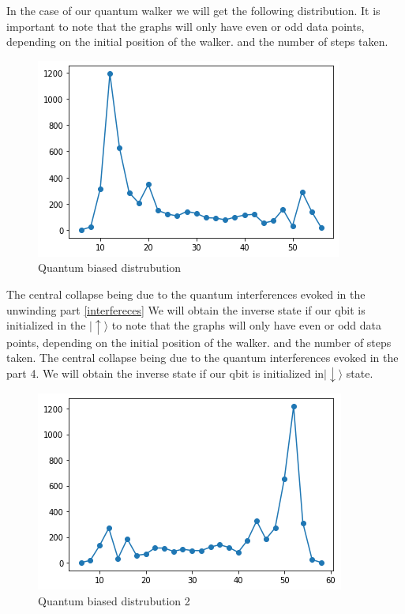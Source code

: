 \documentclass[9pt,journal,compsoc]{IEEEtran}
\begin{document}
        In the case of our quantum walker we will get the following distribution.
        It is important to note that the graphs will only have even or odd data points, depending on the initial position of the walker. and the number of steps taken.
        \begin{figure}[htp!]
            \centering
            \includegraphics[scale=0.4]{assets/img/quantum_left_distribution.png}
            \caption{Quantum biased distrubution \cite{QuantumDemoDauliac2022}}
            \label{fig:opposing}
        \end{figure}

        The central collapse being due to the quantum interferences evoked in the unwinding part \ref{interfereces}
        We will obtain the inverse state if our qbit is initialized in the $\lvert\uparrow\rangle$ to note that the graphs will only have even or odd data points, depending on the initial position of the walker. and the number of steps taken. The central collapse being due to the quantum interferences evoked in the part 4. We will obtain the inverse state if our qbit is initialized in$\lvert\downarrow\rangle$ state.

        \begin{figure}[htp!]
            \centering
            \includegraphics[scale=0.4]{assets/img/quantum_right_distribution.png}
            \caption{Quantum biased distrubution 2\cite{QuantumDemoDauliac2022}}
            \label{fig:opposing}
        \end{figure}
        
\end{document}
